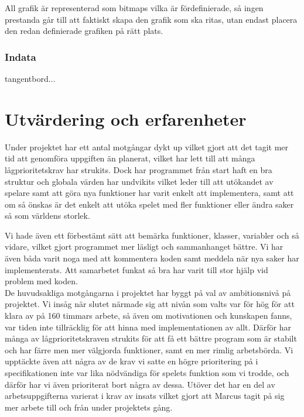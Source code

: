 \documentclass[12pt,a4paper]{article}
\begin{document}
\vspace{0.2cm}

All grafik är representerad som bitmaps vilka är fördefinierade, så ingen prestanda går till att faktiskt skapa den grafik som ska ritas, utan endast placera den redan definierade grafiken på rätt plats.


\subsubsection{Indata} 
tangentbord...




\section{Utvärdering och erfarenheter}
    
Under projektet har ett antal motgångar dykt up vilket gjort att det tagit mer tid att genomföra uppgiften än planerat, vilket har lett till att många lågprioritetskrav har strukits. Dock har programmet från start haft en bra struktur och globala värden har undvikits vilket leder till att utökandet av spelare samt att göra nya funktioner har varit enkelt att implementera, samt att om så önskas är det enkelt att utöka spelet med fler funktioner eller ändra saker så som världens storlek.

Vi hade även ett förbestämt sätt att bemärka funktioner, klasser, variabler och så vidare, vilket gjort programmet mer läsligt och sammanhanget bättre.
Vi har även båda varit noga med att kommentera koden samt meddela när nya saker har implementerats.  Att samarbetet funkat så bra har varit till stor hjälp vid problem med koden. \\

De huvudsakliga motgångarna i projektet har byggt på val av ambitionsnivå på projektet. Vi insåg när slutet närmade sig att nivån som valts var för hög för att klara av på 160 timmars arbete, så även om motivationen och kunskapen fanns, var tiden inte tillräcklig för att hinna med implementationen av allt. Därför har många av lågprioritetskraven strukits för att få ett bättre program som är stabilt och har färre men mer välgjorda funktioner, samt en mer rimlig arbetsbörda. Vi upptäckte även att några av de krav vi satte en högre prioritering på i specifikationen inte var lika nödvändiga för spelets funktion som vi trodde, och därför har vi även prioriterat bort några av dessa. Utöver det har en del av arbetsuppgifterna varierat i krav av insats vilket gjort att Marcus tagit på sig mer arbete till och från under projektets gång. \\
\end{document}
